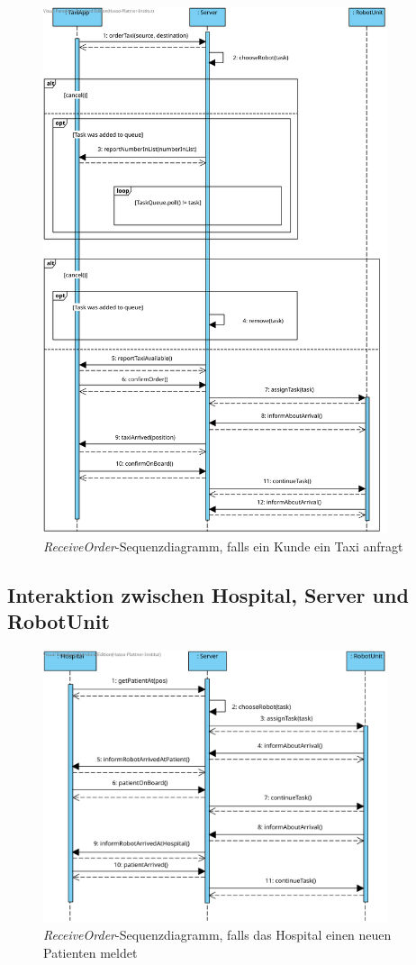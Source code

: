 \begin{figure}[H]
	\centering
	\includegraphics[width=0.9\textwidth]{img/2-Entwurf-ReceiveOrder-Taxi}
	\caption{\emph{ReceiveOrder}-Sequenzdiagramm, falls ein Kunde ein Taxi anfragt}
	\label{SequenzDiagrammInteraktionTaxi}
\end{figure}

\subsection*{Interaktion zwischen Hospital, Server und RobotUnit}

\begin{figure}[H]
	\centering
	\includegraphics[width=0.9\textwidth]{img/2-Entwurf-ReceiveOrder-Hosp}
	\caption{\emph{ReceiveOrder}-Sequenzdiagramm, falls das Hospital einen neuen Patienten meldet}
	\label{SequenzDiagrammInteraktionHospital}
\end{figure}


